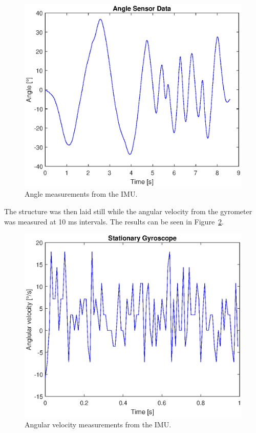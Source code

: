 \begin{figure}[H]
    \centering
    \includegraphics[width=.9\linewidth]{figures/plot_angle.eps}
    \caption{Angle measurements from the IMU.}
    \label{fig:imu_angle}
\end{figure}

\noindent
The structure was then laid still while the angular velocity from the gyrometer was measured at 10 ms intervals. The results can be seen in Figure~\ref{fig:imu_gyro}.

\begin{figure}[H]
    \centering
    \includegraphics[width=.9\linewidth]{figures/plot_stationary.eps}
    \caption{Angular velocity measurements from the IMU.}
    \label{fig:imu_gyro}
\end{figure}

